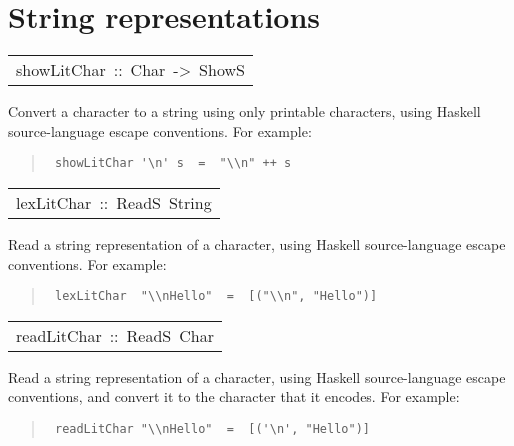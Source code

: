 \section{String representations
}
\begin{haddockdesc}
\item[\begin{tabular}{@{}l}
showLitChar\ ::\ Char\ ->\ ShowS
\end{tabular}]\haddockbegindoc
Convert a character to a string using only printable characters,
 using Haskell source-language escape conventions.  For example:
\par
\begin{quote}
{\haddockverb\begin{verbatim}
 showLitChar '\n' s  =  "\\n" ++ s
\end{verbatim}}
\end{quote}

\end{haddockdesc}
\begin{haddockdesc}
\item[\begin{tabular}{@{}l}
lexLitChar\ ::\ ReadS\ String
\end{tabular}]\haddockbegindoc
Read a string representation of a character, using Haskell
 source-language escape conventions.  For example:
\par
\begin{quote}
{\haddockverb\begin{verbatim}
 lexLitChar  "\\nHello"  =  [("\\n", "Hello")]
\end{verbatim}}
\end{quote}

\end{haddockdesc}
\begin{haddockdesc}
\item[\begin{tabular}{@{}l}
readLitChar\ ::\ ReadS\ Char
\end{tabular}]\haddockbegindoc
Read a string representation of a character, using Haskell
 source-language escape conventions, and convert it to the character
 that it encodes.  For example:
\par
\begin{quote}
{\haddockverb\begin{verbatim}
 readLitChar "\\nHello"  =  [('\n', "Hello")]
\end{verbatim}}
\end{quote}

\end{haddockdesc}